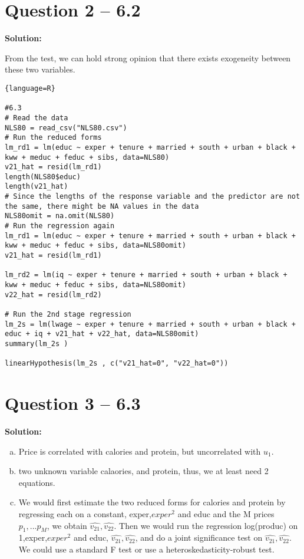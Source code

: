 \documentclass[11pt]{article} %
\begin{document}
\section{Question 2 -- 6.2}
\textbf{Solution:}

From the test, we can hold strong opinion that there exists exogeneity between these two variables.

\begin{lstlisting}{language=R}

#6.3
# Read the data
NLS80 = read_csv("NLS80.csv")
# Run the reduced forms
lm_rd1 = lm(educ ~ exper + tenure + married + south + urban + black + kww + meduc + feduc + sibs, data=NLS80)
v21_hat = resid(lm_rd1)
length(NLS80$educ)
length(v21_hat)
# Since the lengths of the response variable and the predictor are not the same, there might be NA values in the data
NLS80omit = na.omit(NLS80)
# Run the regression again
lm_rd1 = lm(educ ~ exper + tenure + married + south + urban + black + kww + meduc + feduc + sibs, data=NLS80omit)
v21_hat = resid(lm_rd1)

lm_rd2 = lm(iq ~ exper + tenure + married + south + urban + black + kww + meduc + feduc + sibs, data=NLS80omit)
v22_hat = resid(lm_rd2)

# Run the 2nd stage regression
lm_2s = lm(lwage ~ exper + tenure + married + south + urban + black + educ + iq + v21_hat + v22_hat, data=NLS80omit)
summary(lm_2s )

linearHypothesis(lm_2s , c("v21_hat=0", "v22_hat=0"))
\end{lstlisting}














\section{Question 3 -- 6.3}
\textbf{Solution:}
\begin{enumerate}[a)]
    \item Price is correlated with calories and protein, but uncorrelated with $u_1$.
    \item two unknown variable calaories, and protein, thus, we at least need 2 equations.
    \item We would first estimate the two reduced forms for calories and protein by regressing
    each on a constant, exper,$exper^2$ and educ and the M prices $p_1, ... p_M$, we obtain $\hat{v_{21}},\hat{v_{22}}$. Then we would run the regression log(produc) on 1,exper,$exper^2$ and educ, $\hat{v_{21}},\hat{v_{22}}$, and do a joint significance test on $\hat{v_{21}},\hat{v_{22}}$. We could use a standard F test or use a heteroskedasticity-robust test.
\end{enumerate}
\end{document}
